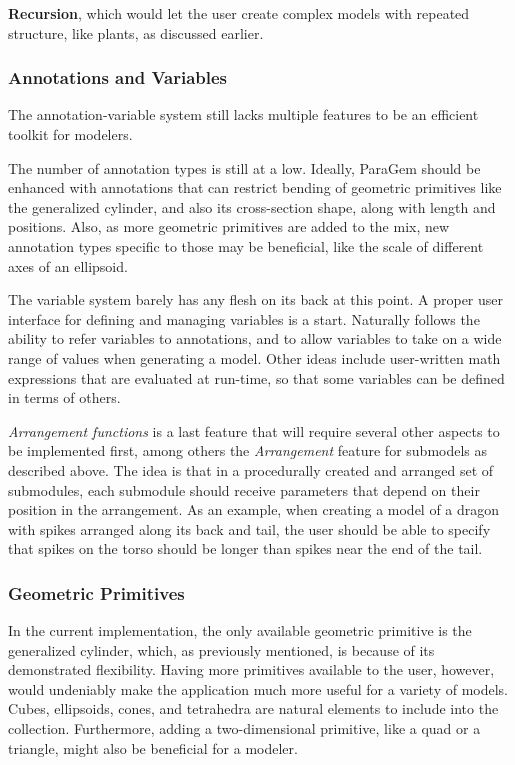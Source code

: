\documentclass[english]{article}
\begin{document}
\textbf{Recursion}, which would let the user create complex models with repeated structure, like plants, as discussed earlier.

\subsubsection{Annotations and Variables}


The annotation-variable system still lacks multiple features to be an efficient toolkit for modelers.

The number of annotation types is still at a low. Ideally, ParaGem should be enhanced with annotations that can restrict bending of geometric primitives like the generalized cylinder, and also its cross-section shape, along with length and positions. Also, as more geometric primitives are added to the mix, new annotation types specific to those may be beneficial, like the scale of different axes of an ellipsoid.

The variable system barely has any flesh on its back at this point. A proper user interface for defining and managing variables is a start. Naturally follows the ability to refer variables to annotations, and to allow variables to take on a wide range of values when generating a model. Other ideas include user-written math expressions that are evaluated at run-time, so that some variables can be defined in terms of others.

\textit{Arrangement functions} is a last feature that will require several other aspects to be implemented first, among others the \textit{Arrangement} feature for submodels as described above. The idea is that in a procedurally created and arranged set of submodules, each submodule should receive parameters that depend on their position in the arrangement. As an example, when creating a model of a dragon with spikes arranged along its back and tail, the user should be able to specify that spikes on the torso should be longer than spikes near the end of the tail.


\subsubsection{Geometric Primitives}

In the current implementation, the only available geometric primitive is the generalized cylinder, which, as previously mentioned, is because of its demonstrated flexibility.
Having more primitives available to the user, however, would undeniably make the application much more useful for a variety of models. Cubes, ellipsoids, cones, and tetrahedra are natural elements to include into the collection. Furthermore, adding a two-dimensional primitive, like a quad or a triangle, might also be beneficial for a modeler.
\end{document}
